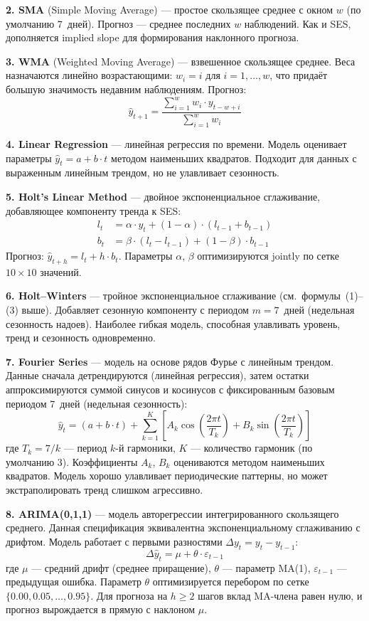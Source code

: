 \textbf{2. SMA} (Simple Moving Average) --- простое скользящее среднее с окном $w$ (по умолчанию 7~дней). Прогноз --- среднее последних $w$ наблюдений. Как и SES, дополняется implied slope для формирования наклонного прогноза.

\textbf{3. WMA} (Weighted Moving Average) --- взвешенное скользящее среднее. Веса назначаются линейно возрастающими: $w_i = i$ для $i = 1, \ldots, w$, что придаёт большую значимость недавним наблюдениям. Прогноз:
$$\hat{y}_{t+1} = \frac{\sum_{i=1}^{w} w_i \cdot y_{t-w+i}}{\sum_{i=1}^{w} w_i}$$

\textbf{4. Linear Regression} --- линейная регрессия по времени. Модель оценивает параметры $\hat{y}_t = a + b \cdot t$ методом наименьших квадратов. Подходит для данных с выраженным линейным трендом, но не улавливает сезонность.

\textbf{5. Holt's Linear Method} --- двойное экспоненциальное сглаживание, добавляющее компоненту тренда к SES:
\begin{align}
l_t &= \alpha \cdot y_t + (1 - \alpha) \cdot (l_{t-1} + b_{t-1}) \\
b_t &= \beta \cdot (l_t - l_{t-1}) + (1 - \beta) \cdot b_{t-1}
\end{align}
Прогноз: $\hat{y}_{t+h} = l_t + h \cdot b_t$. Параметры $\alpha$, $\beta$ оптимизируются jointly по сетке $10 \times 10$ значений.

\textbf{6. Holt--Winters} --- тройное экспоненциальное сглаживание (см.~формулы~(1)--(3) выше). Добавляет сезонную компоненту с периодом $m = 7$~дней (недельная сезонность надоев). Наиболее гибкая модель, способная улавливать уровень, тренд и сезонность одновременно.

\textbf{7. Fourier Series} --- модель на основе рядов Фурье с линейным трендом. Данные сначала детрендируются (линейная регрессия), затем остатки аппроксимируются суммой синусов и косинусов с фиксированным базовым периодом 7~дней (недельная сезонность):
$$\hat{y}_t = (a + b \cdot t) + \sum_{k=1}^{K} \left[ A_k \cos\!\left(\frac{2\pi t}{T_k}\right) + B_k \sin\!\left(\frac{2\pi t}{T_k}\right) \right]$$
где $T_k = 7 / k$ --- период $k$-й гармоники, $K$ --- количество гармоник (по умолчанию 3). Коэффициенты $A_k$, $B_k$ оцениваются методом наименьших квадратов. Модель хорошо улавливает периодические паттерны, но может экстраполировать тренд слишком агрессивно.

\textbf{8. ARIMA(0,1,1)} --- модель авторегрессии интегрированного скользящего среднего. Данная спецификация эквивалентна экспоненциальному сглаживанию с дрифтом. Модель работает с первыми разностями $\Delta y_t = y_t - y_{t-1}$:
$$\Delta \hat{y}_t = \mu + \theta \cdot \varepsilon_{t-1}$$
где $\mu$ --- средний дрифт (среднее приращение), $\theta$ --- параметр MA(1), $\varepsilon_{t-1}$ --- предыдущая ошибка. Параметр $\theta$ оптимизируется перебором по сетке $\{0.00, 0.05, \ldots, 0.95\}$. Для прогноза на $h \geq 2$ шагов вклад MA-члена равен нулю, и прогноз вырождается в прямую с наклоном $\mu$.

